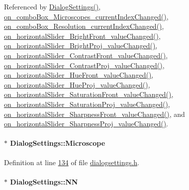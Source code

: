 Referenced by \hyperlink{dialogsettings_8cpp_source_l00005}{Dialog\+Settings()}, \hyperlink{dialogsettings_8cpp_source_l00227}{on\+\_\+combo\+Box\+\_\+\+Microscopes\+\_\+current\+Index\+Changed()}, \hyperlink{dialogsettings_8cpp_source_l00247}{on\+\_\+combo\+Box\+\_\+\+Resolution\+\_\+current\+Index\+Changed()}, \hyperlink{dialogsettings_8cpp_source_l00307}{on\+\_\+horizontal\+Slider\+\_\+\+Bright\+Front\+\_\+value\+Changed()}, \hyperlink{dialogsettings_8cpp_source_l00339}{on\+\_\+horizontal\+Slider\+\_\+\+Bright\+Proj\+\_\+value\+Changed()}, \hyperlink{dialogsettings_8cpp_source_l00313}{on\+\_\+horizontal\+Slider\+\_\+\+Contrast\+Front\+\_\+value\+Changed()}, \hyperlink{dialogsettings_8cpp_source_l00345}{on\+\_\+horizontal\+Slider\+\_\+\+Contrast\+Proj\+\_\+value\+Changed()}, \hyperlink{dialogsettings_8cpp_source_l00326}{on\+\_\+horizontal\+Slider\+\_\+\+Hue\+Front\+\_\+value\+Changed()}, \hyperlink{dialogsettings_8cpp_source_l00358}{on\+\_\+horizontal\+Slider\+\_\+\+Hue\+Proj\+\_\+value\+Changed()}, \hyperlink{dialogsettings_8cpp_source_l00319}{on\+\_\+horizontal\+Slider\+\_\+\+Saturation\+Front\+\_\+value\+Changed()}, \hyperlink{dialogsettings_8cpp_source_l00351}{on\+\_\+horizontal\+Slider\+\_\+\+Saturation\+Proj\+\_\+value\+Changed()}, \hyperlink{dialogsettings_8cpp_source_l00332}{on\+\_\+horizontal\+Slider\+\_\+\+Sharpness\+Front\+\_\+value\+Changed()}, and \hyperlink{dialogsettings_8cpp_source_l00364}{on\+\_\+horizontal\+Slider\+\_\+\+Sharpness\+Proj\+\_\+value\+Changed()}.

\hypertarget{class_dialog_settings_a0aca616bb0f9b57776d49bc5bb8eeeae}{}
\paragraph[{Microscope}]{$\ast$ Dialog\+Settings\+::\+Microscope\hspace{0.3cm}{\ttfamily [private]}}\label{class_dialog_settings_a0aca616bb0f9b57776d49bc5bb8eeeae}


Definition at line \hyperlink{dialogsettings_8h_source_l00134}{134} of file \hyperlink{dialogsettings_8h_source}{dialogsettings.\+h}.

\hypertarget{class_dialog_settings_a7a2bdfd8a1a5812d89d7019ae8b909c2}{}
\paragraph[{N\+N}]{$\ast$ Dialog\+Settings\+::\+N\+N\hspace{0.3cm}{\ttfamily [private]}}\label{class_dialog_settings_a7a2bdfd8a1a5812d89d7019ae8b909c2}


